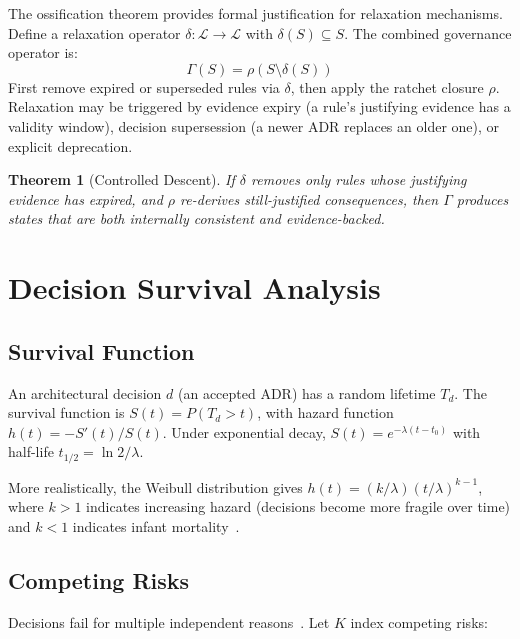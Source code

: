 \documentclass[11pt, a4paper, logo, copyright]{googledeepmind}
\newtheorem{theorem}{Theorem}[section]
\begin{document}
The ossification theorem provides formal justification for relaxation mechanisms. Define a relaxation operator $\delta: \mathcal{L} \to \mathcal{L}$ with $\delta(S) \subseteq S$. The combined governance operator is:
\begin{equation}
    \Gamma(S) = \rho(S \setminus \delta(S))
\end{equation}
First remove expired or superseded rules via $\delta$, then apply the ratchet closure $\rho$. Relaxation may be triggered by evidence expiry (a rule's justifying evidence has a validity window), decision supersession (a newer ADR replaces an older one), or explicit deprecation.

\begin{theorem}[Controlled Descent]
If $\delta$ removes only rules whose justifying evidence has expired, and $\rho$ re-derives still-justified consequences, then $\Gamma$ produces states that are both internally consistent and evidence-backed.
\end{theorem}


\section{Decision Survival Analysis}
\label{sec:survival}

\subsection{Survival Function}

An architectural decision $d$ (an accepted ADR) has a random lifetime $T_d$. The survival function is $S(t) = P(T_d > t)$, with hazard function $h(t) = -S'(t)/S(t)$. Under exponential decay, $S(t) = e^{-\lambda(t - t_0)}$ with half-life $t_{1/2} = \ln 2 / \lambda$.

More realistically, the Weibull distribution gives $h(t) = (k/\lambda)(t/\lambda)^{k-1}$, where $k > 1$ indicates increasing hazard (decisions become more fragile over time) and $k < 1$ indicates infant mortality~\citep{herraiz2021}.

\subsection{Competing Risks}

Decisions fail for multiple independent reasons~\citep{fine1999, cox1972}. Let $K$ index competing risks:
\end{document}
